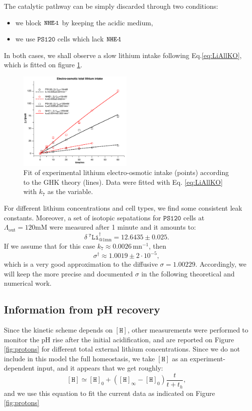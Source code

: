 \documentclass[aps,onecolumn,11pt]{revtex4}
\newcommand{\mychem}[1]{\mathtt{#1}}
\newcommand{\myconc}[1]{\left\lbrack{#1}\right\rbrack}
\newcommand{\spLi}[1]{{~^{\mychem{#1}}\mychem{Li}}}
\newcommand{\spproton}{\mychem{H}}
\newcommand{\proton}{\myconc{\spproton}}
\newcommand{\deltaLi}{ {\delta\!\!\!\spLi{7}} }
\newcommand{\LiAll}{\Lambda}
\newcommand{\LiAllOut}{{\LiAll}_{\mathrm{out}}}
\newcommand{\NHE}[1]{\mychem{NHE}{\mychem{\hbox{-}\!#1}}}
\newcommand{\todo}[1]{\framebox{\textbf{\color{WildStrawberry}{#1}}}}
\newcommand{\ko}{\dagger}
\begin{document}
The catalytic pathway can be simply discarded through two conditions:
\begin{itemize}
	\item we block $\NHE{1}$ by keeping the acidic medium,
	\item we use   $\mychem{PS120}$ cells which lack $\NHE{1}$
\end{itemize}
In both cases, we shall observe a slow lithium intake following Eq.\eqref{eq:LiAllKO}, which is fitted on figure \ref{fig:leak}.
\begin{figure}[!ht]
\begin{center}
\includegraphics[width=0.5\textwidth]{leaks.pdf}
\end{center}
\caption{\label{fig:leak} Fit of experimental lithium electro-osmotic intake (points) according to the GHK theory (lines). Data were fitted with
Eq. \eqref{eq:LiAllKO} with $k_7$ as the variable.}
\end{figure}
For different lithium concentrations and cell types, we find some consistent leak constants.
Moreover, a set of isotopic sepatations for $\mychem{PS120}$ cells at $\LiAllOut=120\text{mM}$ were measured after 1 minute and it amounts to:
\begin{equation}
\label{eq:d7ps120}
\deltaLi^\ko_{@1\text{mn}} = 12.6435 \pm 0.025.
\end{equation}
If we assume that
for this case $k_7\approx0.0026\,\text{mn}^{-1}$, then
\begin{equation}
	\sigma^\ko \approx 1.0019 \pm 2\cdot10^{-5},
\end{equation}
which is a very good approximation \todo{given the crude assumptions} to the diffusive $\sigma=1.00229$. Accordingly, we will keep the more precise and documented $\sigma$ 
in the following theoretical and numerical work.

\subsection{Information from pH recovery}
Since the kinetic scheme depends on $\proton$, other measurements were performed to monitor the pH rise after the initial acidification, 
and are reported on Figure \ref{fig:protons} for different total external lithium concentrations. Since we do not include in this model the full homeostasis,
we take $\proton$ as an experiment-dependent input, and it appears that we get roughly:
\begin{equation}
\label{eq:hfit}
	\proton \simeq \proton_0 + \left(\proton_\infty-\proton_0\right) \dfrac{t}{t+t_h},
\end{equation}
and we use this equation to fit the current data as indicated on Figure \ref{fig:protons} 
\end{document}
